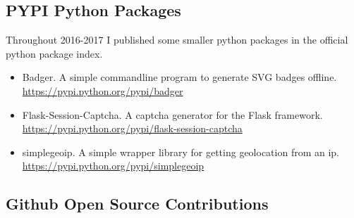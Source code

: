 \documentclass[a4paper,10pt]{article}
\begin{document}
\subsection{PYPI Python Packages}
Throughout 2016-2017 I published some smaller python packages in the official python package index.

\begin{itemize}
\item Badger. A simple commandline program to generate SVG badges offline.\\ \href{https://pypi.python.org/pypi/badger}{https://pypi.python.org/pypi/badger}
\item Flask-Session-Captcha. A captcha generator for the Flask framework.\\ \href{https://pypi.python.org/pypi/flask-session-captcha}{https://pypi.python.org/pypi/flask-session-captcha}
\item simplegeoip. A simple wrapper library for getting geolocation from an ip.\\ \href{https://pypi.python.org/pypi/simplegeoip}{https://pypi.python.org/pypi/simplegeoip}
\end{itemize}

\newpage
\subsection{Github Open Source Contributions}

\end{document}
